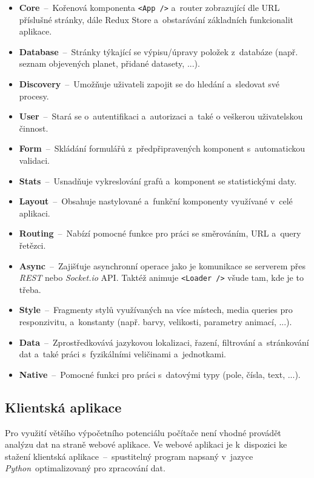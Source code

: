 \documentclass[a4paper,12pt]{article}
\def\code#1{\texttt{#1}}
\begin{document}
{{{{{{{{\begin{itemize}
\item \textbf{Core}~--~Kořenová komponenta \code{<App />} a~router zobrazující dle URL příslušné stránky, dále Redux Store a~obstarávání základních funkcionalit aplikace.
\item \textbf{Database}~--~Stránky týkající se výpisu/úpravy položek z~databáze (např. seznam objevených planet, přidané datasety, ...).
\item \textbf{Discovery}~--~Umožňuje uživateli zapojit se do hledání a~sledovat své procesy.
\item \textbf{User}~--~Stará se o~autentifikaci a~autorizaci a~také o veškerou uživatelskou činnost.
\item \textbf{Form}~--~Skládání formulářů z~předpřipravených komponent s~automatickou validaci.
\item \textbf{Stats}~--~Usnadňuje vykreslování grafů a~komponent se statistickými daty.
\item \textbf{Layout}~--~Obsahuje nastylované a~funkční komponenty využívané v~celé aplikaci.
\item \textbf{Routing}~--~Nabízí pomocné funkce pro práci se směrováním, URL a~query řetězci.
\item \textbf{Async}~--~Zajišťuje asynchronní operace jako je komunikace se serverem přes \textit{REST} nebo \textit{Socket.io} API. Taktéž animuje \code{<Loader />} všude tam, kde je to třeba.
\item \textbf{Style}~--~Fragmenty stylů využívaných na více místech, media queries pro responzivitu, a~konstanty (např. barvy, velikosti, parametry animací, ...).
\item \textbf{Data}~--~Zprostředkovává jazykovou lokalizaci, řazení, filtrování a~stránkování dat a~také práci s~fyzikálními veličinami a~jednotkami.
\item \textbf{Native}~--~Pomocné funkci pro práci s~datovými typy (pole, čísla, text, ...).
\end{itemize}

\vspace{-5pt}

\subsection{Klientská aplikace}
\vspace{-5pt}
Pro využití většího výpočetního potenciálu počítače není vhodné provádět analýzu dat na straně webové aplikace. Ve webové aplikaci je k~dispozici ke stažení klientská aplikace~--~spustitelný program napsaný v~jazyce \textit{Python}~optimalizovaný pro zpracování dat.

}}}}}}}}
\end{document}
